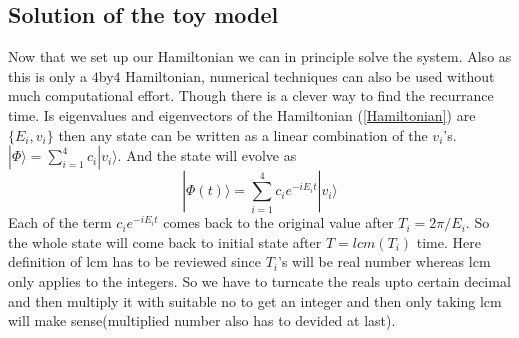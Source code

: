 \documentclass[a4paper,two column]{article}
\begin{document}
            \subsection{Solution of the toy model}\label{subsec:solutiontoymodel}
                Now that we set up our Hamiltonian we can in principle solve the system. Also as this is only a $4$by$4$ Hamiltonian, numerical techniques can also be used without much computational effort. Though there is a clever way to find the recurrance time. Is eigenvalues and eigenvectors of the Hamiltonian (\ref{Hamiltonian}) are $\{E_i,v_i\}$ then any state can be written as a linear combination of the $v_i$'s. $|\Phi\rangle = \sum_{i=1}^{4} c_i |v_i\rangle$. And the state will evolve as 
                \begin{equation}
                    |\Phi(t)\rangle = \sum_{i=1}^{4} c_i e^{-iE_i t} |v_i\rangle
                \end{equation}
                Each of the term $c_i  e^{-iE_i t}$ comes back to the original value after $T_i = 2\pi/E_i$. So the whole state will come back to initial state after $T = lcm(T_i)$ time. Here definition of lcm has to be reviewed since $T_i$'s will be real number whereas lcm only applies to the integers. So we have to turncate the reals upto certain decimal and then multiply it with suitable no to get an integer and then only taking lcm will make sense(multiplied number also has to devided at last). 
            
\end{document}
